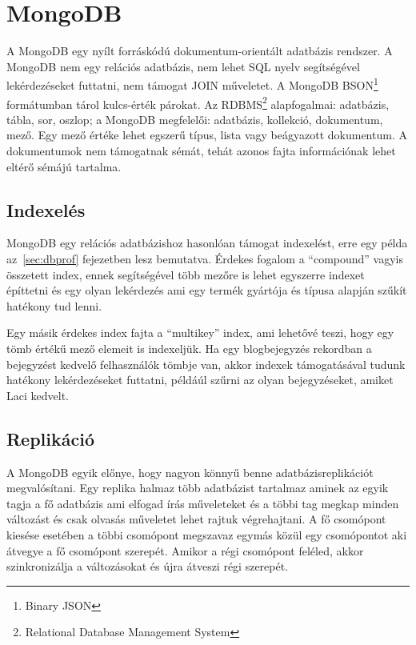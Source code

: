\section{MongoDB}

A MongoDB egy nyílt forráskódú dokumentum-orientált adatbázis rendszer. A MongoDB nem egy relációs adatbázis, nem lehet SQL nyelv segítségével lekérdezéseket futtatni, nem támogat JOIN műveletet. A MongoDB BSON\footnote{Binary JSON} formátumban tárol kulcs-érték párokat. Az RDBMS\footnote{Relational Database Management System} alapfogalmai: adatbázis, tábla, sor, oszlop; a MongoDB megfelelői: adatbázis, kollekció, dokumentum, mező. Egy mező értéke lehet egszerű típus, lista vagy beágyazott dokumentum. A dokumentumok nem támogatnak sémát, tehát azonos fajta információnak lehet eltérő sémájú tartalma. 


\subsection{Indexelés}

MongoDB egy relációs adatbázishoz hasonlóan támogat indexelést, erre egy példa az~\ref{sec:dbprof} fejezetben lesz bemutatva. Érdekes fogalom a ``compound'' vagyis összetett index, ennek segítségével több mezőre is lehet egyszerre indexet építtetni és egy olyan lekérdezés ami egy termék gyártója és típusa alapján szűkít hatékony tud lenni.

Egy másik érdekes index fajta a ``multikey'' index, ami lehetővé teszi, hogy egy tömb értékű mező elemeit is indexeljük. Ha egy blogbejegyzés rekordban a bejegyzést kedvelő felhasználók tömbje van, akkor indexek támogatásával tudunk hatékony lekérdezéseket futtatni, példáúl szűrni az olyan bejegyzéseket, amiket Laci kedvelt.

\subsection{Replikáció}

A MongoDB egyik előnye, hogy nagyon könnyű benne adatbázisreplikációt megvalósítani. Egy replika halmaz több adatbázist tartalmaz aminek az egyik tagja a fő adatbázis ami elfogad írás műveleteket és a többi tag megkap minden változást és csak olvasás műveletet lehet rajtuk végrehajtani. A fő csomópont kiesése esetében a többi csomópont megszavaz egymás közül egy csomópontot aki átvegye a fő csomópont szerepét. Amikor a régi csomópont feléled, akkor szinkronizálja a változásokat és újra átveszi régi szerepét.

